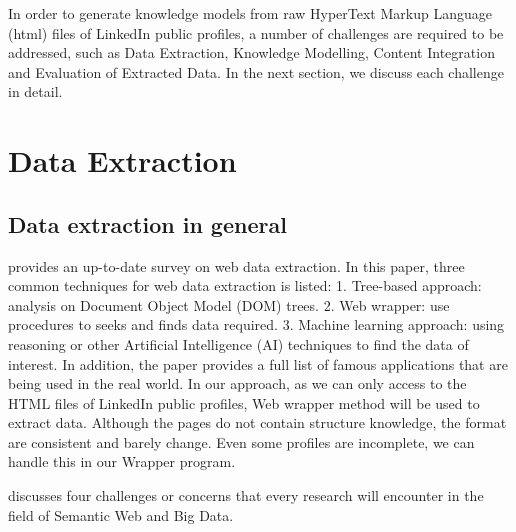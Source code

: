 In order to generate knowledge models from raw HyperText Markup Language (html) files of LinkedIn public profiles, a number of challenges are required to be addressed, such as Data Extraction, Knowledge Modelling, Content Integration and Evaluation of Extracted Data. In the next section, we discuss each challenge in detail.

\section{Data Extraction}

\subsection{Data extraction in general}

\cite{ferrara2012} provides an up-to-date survey on web data extraction. In this paper, three common techniques for web data extraction is listed: 1. Tree-based approach: analysis on Document Object Model (DOM) trees. 2. Web wrapper: use procedures to seeks and finds data required. 3. Machine learning approach: using reasoning or other Artificial Intelligence (AI) techniques to find the data of interest. In addition, the paper provides a full list of famous applications that are being used in the real world. In our approach, as we can only access to the HTML files of LinkedIn public profiles, Web wrapper method will be used to extract data. Although the pages do not contain structure knowledge, the format are consistent and barely change. Even some profiles are incomplete, we can handle this in our Wrapper program.

\cite{bizer2012} discusses four challenges or concerns that every research will encounter in the field of Semantic Web and Big Data.


